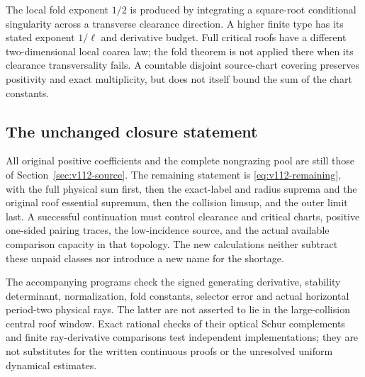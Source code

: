 The local fold exponent $1/2$ is produced by integrating a square-root
conditional singularity across a transverse clearance direction.
A higher finite type has its stated exponent $1/\ell$ and derivative
budget. Full critical roofs have a different two-dimensional local
coarea law; the fold theorem is not applied there when its clearance
transversality fails. A countable disjoint source-chart covering
preserves positivity and exact multiplicity, but does not itself
bound the sum of the chart constants.

\subsection{The unchanged closure statement}
All original positive coefficients and the complete nongrazing pool
are still those of Section~\ref{sec:v112-source}. The remaining
statement is \eqref{eq:v112-remaining}, with the full physical sum
first, then the exact-label and radius suprema and the original roof
essential supremum, then the collision limsup, and the outer limit
last. A successful continuation must control clearance and critical
charts, positive one-sided pairing traces, the low-incidence source,
and the actual available comparison capacity in that topology.
The new calculations neither subtract these unpaid classes nor
introduce a new name for the shortage.

The accompanying programs check the signed generating derivative,
stability determinant, normalization, fold constants, selector error
and actual horizontal period-two physical rays. The latter are not
asserted to lie in the large-collision central roof window. Exact
rational checks of their optical Schur complements and finite
ray-derivative comparisons test independent implementations; they are
not substitutes for the written continuous proofs or the unresolved
uniform dynamical estimates.
